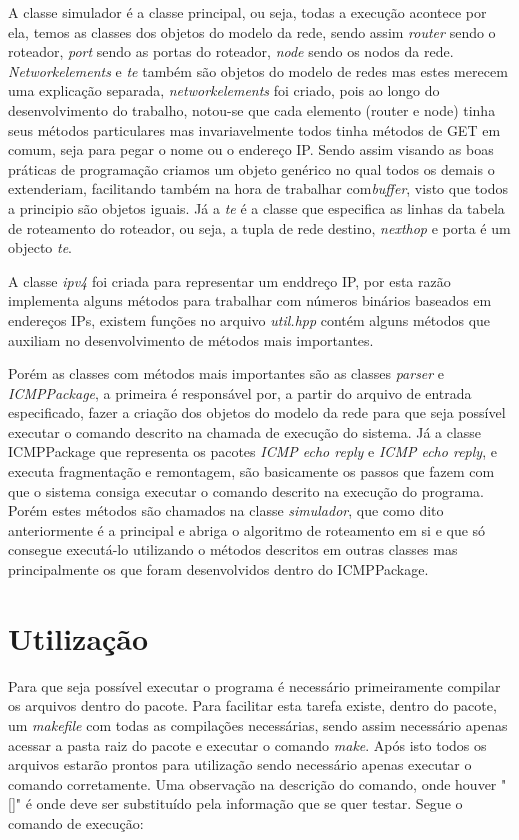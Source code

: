 \documentclass[12pt]{article}
\begin{document}
A classe simulador é a classe principal, ou seja, todas a execução acontece por ela, temos as classes dos objetos do modelo da rede, sendo assim \emph{router} sendo o roteador, \emph{port} sendo as portas do roteador, \emph{node} sendo os nodos da rede. \emph{Networkelements} e \emph{te} também são objetos do modelo de redes mas estes merecem uma explicação separada, \emph{networkelements} foi criado, pois ao longo do desenvolvimento do trabalho, notou-se que cada elemento (router e node) tinha seus métodos particulares mas invariavelmente todos tinha métodos de GET em comum, seja para pegar o nome ou o endereço IP. Sendo assim visando as boas práticas de programação criamos um objeto genérico no qual todos os demais o extenderiam, facilitando também na hora de trabalhar com\emph{buffer}, visto que todos a principio são objetos iguais. Já a \emph{te} é a classe que especifica as linhas da tabela de roteamento do roteador, ou seja, a tupla de rede  destino, \emph{nexthop} e porta é um objecto \emph{te}.


A classe \emph{ipv4} foi criada para representar um enddreço IP, por esta razão implementa alguns métodos para trabalhar com números binários baseados em endereços IPs, existem funções no arquivo \emph{util.hpp} contém alguns métodos que auxiliam no desenvolvimento de métodos mais importantes.


Porém as classes com métodos mais importantes são as classes \emph{parser} e \emph{ICMPPackage}, a primeira é responsável por, a partir do arquivo de entrada especificado, fazer a criação dos objetos do modelo da rede para que seja possível executar o comando descrito na chamada de execução do sistema. Já a classe ICMPPackage que representa os pacotes \emph{ICMP echo reply} e \emph{ICMP echo reply}, e executa fragmentação e remontagem, são basicamente os passos que fazem com que o sistema consiga executar o comando descrito na execução do programa. Porém estes métodos são chamados na classe \emph{simulador}, que como dito anteriormente é a principal e abriga o algoritmo de roteamento em si e que só consegue executá-lo utilizando o métodos descritos em outras classes mas principalmente os que foram desenvolvidos dentro do ICMPPackage.


\section{Utilização}
Para que seja possível executar o programa é necessário primeiramente compilar os arquivos dentro do pacote. Para facilitar esta tarefa existe, dentro do pacote, um \emph{makefile} com todas as compilações necessárias, sendo assim necessário apenas acessar a pasta raiz do pacote e executar o comando \emph{make}. Após isto todos os arquivos estarão prontos para utilização sendo necessário apenas executar o comando corretamente. Uma observação na descrição do comando, onde houver "[]" é onde deve ser substituído pela informação que se quer testar. Segue o comando de execução:
\end{document}
